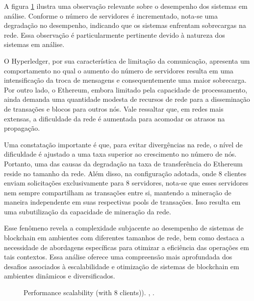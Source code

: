 A figura \ref{perfomance-scability2} ilustra uma observação relevante sobre o desempenho dos sistemas em análise. Conforme o número de servidores é incrementado, nota-se uma degradação no desempenho, indicando que os sistemas enfrentam sobrecargas na rede. Essa observação é particularmente pertinente devido à natureza dos sistemas em análise.

O Hyperledger, por sua característica de limitação da comunicação, apresenta um comportamento no qual o aumento do número de servidores resulta em uma intensificação da troca de mensagens e consequentemente uma maior sobrecarga. Por outro lado, o Ethereum, embora limitado pela capacidade de processamento, ainda demanda uma quantidade modesta de recursos de rede para a disseminação de transações e blocos para outros nós. Vale ressaltar que, em redes mais extensas, a dificuldade da rede é aumentada para acomodar os atrasos na propagação.

Uma constatação importante é que, para evitar divergências na rede, o nível de dificuldade é ajustado a uma taxa superior ao crescimento no número de nós. Portanto, uma das causas da degradação na taxa de transferência do Ethereum reside no tamanho da rede. Além disso, na configuração adotada, onde 8 clientes enviam solicitações exclusivamente para 8 servidores, nota-se que esses servidores nem sempre compartilham as transações entre si, mantendo a mineração de maneira independente em suas respectivas pools de transações. Isso resulta em uma subutilização da capacidade de mineração da rede.

Esse fenômeno revela a complexidade subjacente ao desempenho de sistemas de blockchain em ambientes com diferentes tamanhos de rede, bem como destaca a necessidade de abordagens específicas para otimizar a eficiência das operações em tais contextos. Essa análise oferece uma compreensão mais aprofundada dos desafios associados à escalabilidade e otimização de sistemas de blockchain em ambientes dinâmicos e diversificados.


            \begin{figure}[H]
                \centering
                \caption{Performance scalability (with 8 clients)). \cite{blockbench}, .}
                \label{perfomance-scability2}
            \end{figure}